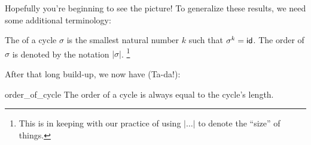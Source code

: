 \noindent
Hopefully you're beginning to see the picture! To generalize these results, we need some additional terminology:

\begin{defn}
The  of a cycle $\sigma$ is the smallest natural number $k$ such that $\sigma^k = {\sf{i}d}$.   The order of $\sigma$ is denoted by the notation $|\sigma|$.
\footnote{This is in keeping with our practice of using $|\ldots|$ to denote the ``size'' of things.}
\end{defn}
After that long build-up, we now have (Ta-da!):

\begin{prop}{order_of_cycle}
The order of a cycle is always equal to the cycle's length.
\end{prop}



